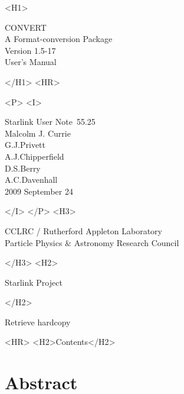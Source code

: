 \documentclass[twoside,11pt]{article}
\newcommand{\stardoccategory}  {Starlink User Note}
\newcommand{\stardocsource}    {sun\stardocnumber}
\newcommand{\stardocnumber}    {55.25}
\newcommand{\stardocauthors}   {Malcolm J. Currie\\
                                G.J.Privett\\
                                A.J.Chipperfield\\
                                D.S.Berry\\
                                A.C.Davenhall}
\newcommand{\stardocdate}      {2009 September 24}
\newcommand{\stardoctitle}     {CONVERT\\
                                A Format-conversion Package}
\newcommand{\stardocversion}   {Version 1.5-17}
\newcommand{\stardocmanual}    {User's Manual}
\newcommand{\htmladdnormallink}[2]{#1}
\newcommand{\htmladdimg}[1]{}
\newcommand{\htmlref}[2]{#1}
\newcommand{\htmladdtonavigation}[1]{}
\newcommand{\xlabel}[1]{}
\begin{document}
\begin{htmlonly}
   \xlabel{}
   \begin{rawhtml} <H1> \end{rawhtml}
      \stardoctitle\\
      \stardocversion\\
      \stardocmanual
   \begin{rawhtml} </H1> <HR> \end{rawhtml}


   \begin{rawhtml} <P> <I> \end{rawhtml}
   \stardoccategory\ \stardocnumber \\
   \stardocauthors \\
   \stardocdate
   \begin{rawhtml} </I> </P> <H3> \end{rawhtml}
      \htmladdnormallink{CCLRC / Rutherford Appleton Laboratory}
                        {http://www.cclrc.ac.uk} \\
      \htmladdnormallink{Particle Physics \& Astronomy Research Council}
                        {http://www.pparc.ac.uk} \\
   \begin{rawhtml} </H3> <H2> \end{rawhtml}
      \htmladdnormallink{Starlink Project}{http://www.starlink.rl.ac.uk/}
   \begin{rawhtml} </H2> \end{rawhtml}
   \htmladdnormallink{\htmladdimg{source.gif} Retrieve hardcopy}
      {http://www.starlink.rl.ac.uk/cgi-bin/hcserver?\stardocsource}\\

  \label{stardoccontents}
  \begin{rawhtml} 
    <HR>
    <H2>Contents</H2>
  \end{rawhtml}
  \htmladdtonavigation{\htmlref{\htmladdimg{contents_motif.gif}}
        {stardoccontents}}

  \section{\xlabel{abstract}Abstract}
\end{htmlonly}
\end{document}
